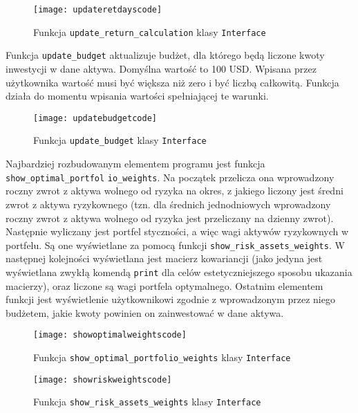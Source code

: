 \documentclass[magister]{dyplom}
\def\code#1{\texttt{#1}}
\begin{document}
\begin{figure}[ht]
	\centering
	\texttt{[image: updateretdayscode]}
	\caption{Funkcja \code{update\_return\_calculation} klasy \code{Interface}}
\end{figure}
\newpage
Funkcja \code{update\_budget} aktualizuje budżet, dla którego będą liczone kwoty inwestycji w dane aktywa. Domyślna wartość to 100 USD. Wpisana przez użytkownika wartość musi być większa niż zero i być liczbą całkowitą. Funkcja działa do momentu wpisania wartości spełniającej te warunki.
\begin{figure}[ht]
	\centering
	\texttt{[image: updatebudgetcode]}
	\caption{Funkcja \code{update\_budget} klasy \code{Interface}}
\end{figure}

Najbardziej rozbudowanym elementem programu jest funkcja \code{show\_optimal\_portfol} \code{io\_weights}. Na początek przelicza ona wprowadzony roczny zwrot z aktywa wolnego od ryzyka na okres, z jakiego liczony jest średni zwrot z aktywa ryzykownego (tzn. dla średnich jednodniowych wprowadzony roczny zwrot z aktywa wolnego od ryzyka jest przeliczany na dzienny zwrot). Następnie wyliczany jest portfel styczności, a więc wagi aktywów ryzykownych w portfelu. Są one wyświetlane za pomocą funkcji \code{show\_risk\_assets\_weights}. W następnej kolejności wyświetlana jest macierz kowariancji (jako jedyna jest wyświetlana zwykłą komendą \code{print} dla celów estetyczniejszego sposobu ukazania macierzy), oraz liczone są wagi portfela optymalnego. Ostatnim elementem funkcji jest wyświetlenie użytkownikowi zgodnie z wprowadzonym przez niego budżetem, jakie kwoty powinien on zainwestować w dane aktywa.

\begin{figure}[ht]
	\centering
	\texttt{[image: showoptimalweightscode]}
	\caption{Funkcja \code{show\_optimal\_portfolio\_weights} klasy \code{Interface}}
\end{figure}

\begin{figure}[h]
	\centering
	\texttt{[image: showriskweightscode]}
	\caption{Funkcja \code{show\_risk\_assets\_weights} klasy \code{Interface}}
\end{figure}
\end{document}
